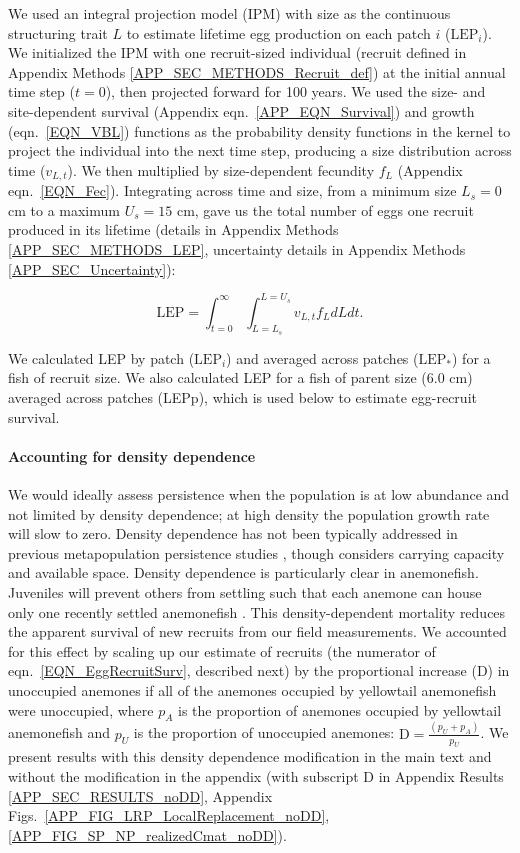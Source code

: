 \documentclass[12pt, oneside]{article}   	%
\begin{document}
We used an integral projection model (IPM) \citep{ellner2016data} with size as the continuous structuring trait $L$ to estimate lifetime egg production on each patch $i$ ($\text{LEP}_i$). We initialized the IPM with one recruit-sized individual (recruit defined in Appendix Methods \ref{APP_SEC_METHODS_Recruit_def}) at the initial annual time step ($t=0$), then projected forward for 100 years. We used the size- and site-dependent survival (Appendix eqn.\ \ref{APP_EQN_Survival}) and growth (eqn.\ \ref{EQN_VBL}) functions as the probability density functions in the kernel to project the individual into the next time step, producing a size distribution across time ($v_{L,t}$). We then multiplied by size-dependent fecundity $f_L$ (Appendix eqn.\ \ref{EQN_Fec}). Integrating across time and size, from a minimum size $L_s=0$ cm to a maximum $U_s=15$ cm, gave us the total number of eggs one recruit produced in its lifetime (details in Appendix Methods \ref{APP_SEC_METHODS_LEP}, uncertainty details in Appendix Methods \ref{APP_SEC_Uncertainty}):

\begin{equation}
\text{LEP} = \int_{t=0}^{\infty}\int_{L=L_s}^{L=U_s} v_{L,t} f_L dL dt. \label{EQN_LEP}
\end{equation}

We calculated LEP by patch ($\text{LEP}_i$) and averaged across patches ($\text{LEP}_*$) for a fish of recruit size. We also calculated LEP for a fish of parent size (6.0 cm) averaged across patches (LEPp), which is used below to estimate egg-recruit survival.

\paragraph*{Accounting for density dependence}  

We would ideally assess persistence when the population is at low abundance and not limited by density dependence; at high density the population growth rate will slow to zero. Density dependence has not been typically addressed in previous metapopulation persistence studies \citep{johnson2018integrating, carson2011evaluating, hameed2016inverse}, though \cite{salles_coral_2015} considers carrying capacity and available space. Density dependence is particularly clear in anemonefish. Juveniles will prevent others from settling such that each anemone can house only one recently settled anemonefish \citep{buston2003forcible}. This density-dependent mortality reduces the apparent survival of new recruits from our field measurements. We accounted for this effect by scaling up our estimate of recruits (the numerator of eqn.\ \ref{EQN_EggRecruitSurv}, described next) by the proportional increase ($\text{D}$) in unoccupied anemones if all of the anemones occupied by yellowtail anemonefish were unoccupied, where $p_A$ is the proportion of anemones occupied by yellowtail anemonefish and $p_U$ is the proportion of unoccupied anemones: $\text{D} = \frac{(p_U + p_A)}{p_U}$. We present results with this density dependence modification in the main text and without the modification in the appendix (with subscript D in Appendix Results \ref{APP_SEC_RESULTS_noDD}, Appendix Figs.\ \ref{APP_FIG_LRP_LocalReplacement_noDD}, \ref{APP_FIG_SP_NP_realizedCmat_noDD}). 
\end{document}
